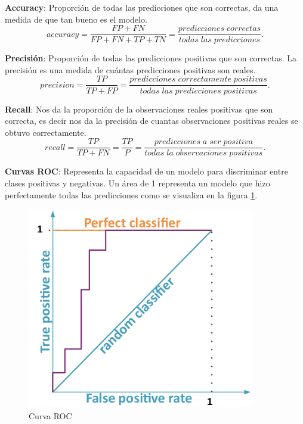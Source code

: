 \textbf{Accuracy}: Proporción de todas las predicciones que son correctas, da una medida de que tan bueno es el modelo.
\begin{equation}
accuracy = \frac{FP+FN}{FP+FN+TP+TN}=\frac{predicciones\;correctas}{todas\;las\;predicciones}.
\end{equation}

\textbf{Precisión}: Proporción de todas las predicciones positivas que son correctas. La precisión es una medida de cuántas predicciones positivas son reales.
\begin{equation}
precision=\frac{TP}{TP+FP}= \frac{predicciones\;correctamente\;positivas}{todas\;las\;predicciones\;positivas}.
\end{equation}

\textbf{Recall}: Nos da la proporción de la observaciones reales positivas que son correcta, es decir nos da la precisión de cuantas observaciones positivas reales se obtuvo correctamente.
\begin{equation}
recall = \frac{TP}{TP+FN} = \frac{TP}{P} = \frac{predicciones\;a\;ser\;positiva}{todas\;la\;observaciones\;positivas} .
\end{equation}

\textbf{Curvas ROC}: Representa la capacidad de un modelo para discriminar entre clases positivas y negativas. Un área de 1 representa un modelo que hizo perfectamente todas las predicciones como se visualiza en la figura \ref{Fig: roc}.
\begin{figure}[H]
 \centering
  \includegraphics[scale=0.6,keepaspectratio=true,clip=true]{imagenes/MarcoTeorico/curvas-roc.png}
  \caption{Curva ROC} \label{Fig: roc}
\end{figure}

